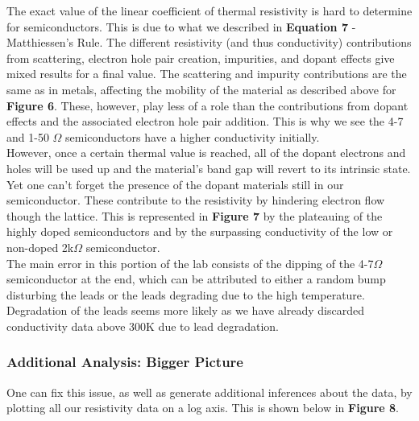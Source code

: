 \documentclass[11pt]{article}
\begin{document}
The exact value of the linear coefficient of thermal resistivity is hard to determine for semiconductors. This is due to what we described in \textbf{Equation 7} - Matthiessen's Rule. The different resistivity (and thus conductivity) contributions from scattering, electron hole pair creation, impurities, and dopant effects give mixed results for a final value. The scattering and impurity contributions are the same as in metals, affecting the mobility of the material as described above for \textbf{Figure 6}. These, however, play less of a role than the contributions from dopant effects and the associated electron hole pair addition. This is why we see the 4-7 and 1-50 $\Omega$ semiconductors have a higher conductivity initially.\\

However, once a certain thermal value is reached, all of the dopant electrons and holes will be used up and the material's band gap will revert to its intrinsic state. Yet one can't forget the presence of the dopant materials still in our semiconductor. These contribute to the resistivity by hindering electron flow though the lattice. This is represented in \textbf{Figure 7} by the plateauing of the highly doped semiconductors and by the surpassing conductivity of the low or non-doped 2k$\Omega$ semiconductor.\\

The main error in this portion of the lab consists of the dipping of the 4-7$\Omega$ semiconductor at the end, which can be attributed to either a random bump disturbing the leads or the leads degrading due to the high temperature. Degradation of the leads seems more likely as we have already discarded conductivity data above 300K due to lead degradation.

\subsubsection*{Additional Analysis: Bigger Picture}
One can fix this issue, as well as generate additional inferences about the data, by plotting all our resistivity data on a log axis. This is shown below in \textbf{Figure 8}.
\end{document}
